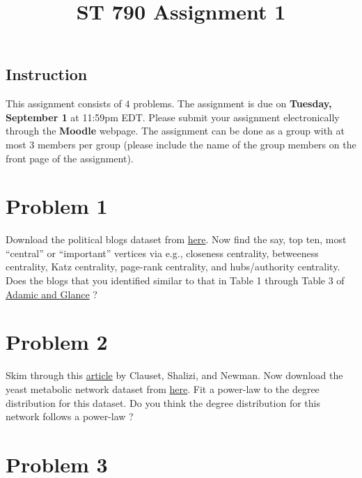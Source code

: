 \documentclass[
]{article}
\title{ST 790 Assignment 1}
\author{}
\date{\vspace{-2.5em}}
\begin{document}
\maketitle

\hypertarget{instruction}{%
\subsection{Instruction}\label{instruction}}

This assignment consists of \(4\) problems. The assignment is due on
\textbf{Tuesday, September 1} at 11:59pm EDT. Please submit your
assignment electronically through the \textbf{Moodle} webpage. The
assignment can be done as a group with at most 3 members per group
(please include the name of the group members on the front page of the
assignment).

\hypertarget{problem-1}{%
\section{Problem 1}\label{problem-1}}

Download the political blogs dataset from
\href{http://www-personal.umich.edu/~mejn/netdata/}{here}. Now find the
say, top ten, most ``central'' or ``important'' vertices via e.g.,
closeness centrality, betweeness centrality, Katz centrality, page-rank
centrality, and hubs/authority centrality. Does the blogs that you
identified similar to that in Table 1 through Table 3 of
\href{http://www.ramb.ethz.ch/CDstore/www2005-ws/workshop/wf10/AdamicGlanceBlogWWW.pdf}{Adamic
and Glance} ?

\hypertarget{problem-2}{%
\section{Problem 2}\label{problem-2}}

Skim through this \href{https://arxiv.org/pdf/0706.1062.pdf}{article} by
Clauset, Shalizi, and Newman. Now download the yeast metabolic network
dataset from
\href{http://tuvalu.santafe.edu/~aaronc/powerlaws/data.htm}{here}. Fit a
power-law to the degree distribution for this dataset. Do you think the
degree distribution for this network follows a power-law ?

\hypertarget{problem-3}{%
\section{Problem 3}\label{problem-3}}
\end{document}
